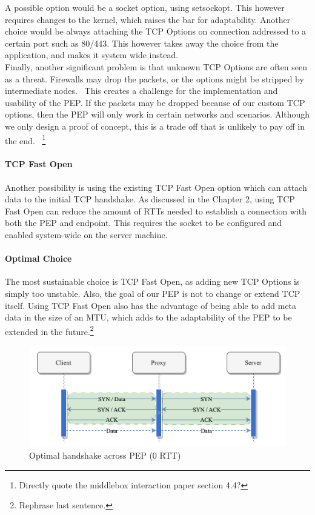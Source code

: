 \documentclass[a4paper,english, 11pt]{report}
\begin{document}
A possible option would be a socket option, using setsockopt. This however requires changes to the kernel, which raises the bar for adaptability. Another choice would be always attaching the TCP Options on connection addressed to a certain port such as 80/443. This however takes away the choice from the application, and makes it system wide instead.\\

Finally, another significant problem is that unknown TCP Options are often seen as a threat. Firewalls may drop the packets, or the options might be stripped by intermediate nodes.~\cite{middlebox_interactions} This creates a challenge for the implementation and usability of the PEP. If the packets may be dropped because of our custom TCP options, then the PEP will only work in certain networks and scenarios. Although we only design a proof of concept, this is a trade off that is unlikely to pay off in the end.~\cite{tcp_extendable}
\footnote{Directly quote the middlebox interaction paper section 4.4?}

\paragraph{TCP Fast Open}
Another possibility is using the existing TCP Fast Open option which can attach data to the initial TCP handshake. As discussed in the Chapter 2, using TCP Fast Open can reduce the amount of RTTs needed to establish a connection with both the PEP and endpoint. This requires the socket to be configured and enabled system-wide on the server machine.\\

\paragraph{Optimal Choice}
The most sustainable choice is TCP Fast Open, as adding new TCP Options is simply too unstable. Also, the goal of our PEP is not to change or extend TCP itself. Using TCP Fast Open also has the advantage of being able to add meta data in the size of an MTU, which adds to the adaptability of the PEP to be extended in the future.\footnote{Rephrase last sentence.}

\begin{figure} %
	\centering
	\includegraphics[scale=0.75]{../diagrams/drawio/tcphandshake_optimal.png}
  	\caption{Optimal handshake across PEP (0 RTT)}
  	\label{fig:tcphandshake_optimal}
\end{figure}
\end{document}

